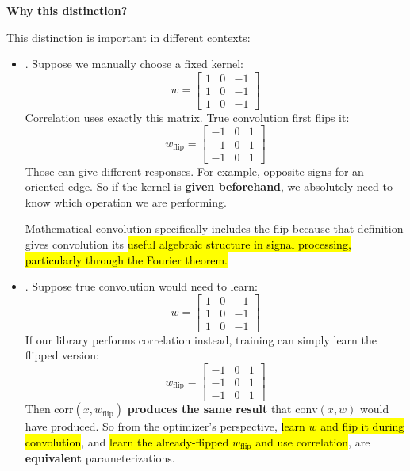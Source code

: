 \highspace
\begin{flushleft}
    \textcolor{Green3}{ \textbf{Why this distinction?}}
\end{flushleft}
This distinction is important in different contexts:
\begin{itemize}
    \item {}. Suppose we manually choose a fixed kernel:
    \begin{equation*}
        w = \begin{bmatrix}
            1 & 0 & -1 \\
            1 & 0 & -1 \\
            1 & 0 & -1
        \end{bmatrix}
    \end{equation*}
    Correlation uses exactly this matrix. True convolution first flips it:
    \begin{equation*}
        w_{\text{flip}} = \begin{bmatrix}
            -1 & 0 & 1 \\
            -1 & 0 & 1 \\
            -1 & 0 & 1
        \end{bmatrix}
    \end{equation*}
    Those can give different responses. For example, opposite signs for an oriented edge. So if the kernel is \textbf{given beforehand}, we absolutely need to know which operation we are performing.

    \highspace
    Mathematical convolution specifically includes the flip because that definition gives convolution its \hl{useful algebraic structure in signal processing, particularly through the Fourier theorem.}


    \item {}. Suppose true convolution would need to learn:
    \begin{equation*}
        w = \begin{bmatrix}
            1 & 0 & -1 \\
            1 & 0 & -1 \\
            1 & 0 & -1
        \end{bmatrix}
    \end{equation*}
    If our library performs correlation instead, training can simply learn the flipped version:
    \begin{equation*}
        w_{\text{flip}} = \begin{bmatrix}
            -1 & 0 & 1 \\
            -1 & 0 & 1 \\
            -1 & 0 & 1
        \end{bmatrix}
    \end{equation*}
    Then $\text{corr}(x, w_{\text{flip}})$ \textbf{produces the same result} that $\text{conv}(x, w)$ would have produced. So from the optimizer's perspective, \hl{learn $w$ and flip it during convolution}, and \hl{learn the already-flipped $w_{\text{flip}}$ and use correlation}, are \textbf{equivalent} parameterizations.


\end{itemize}
